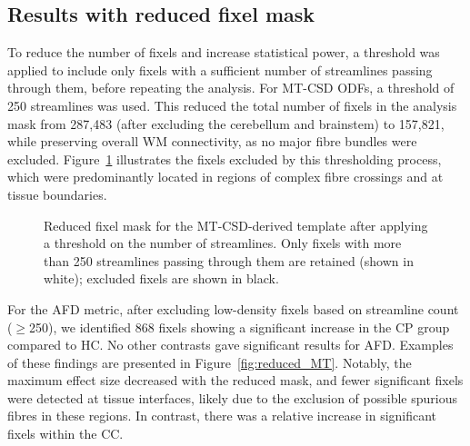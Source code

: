 \subsection{Results with reduced fixel mask}
To reduce the number of fixels and increase statistical power, a threshold was applied to include only fixels with a sufficient number of streamlines passing through them, before repeating the analysis. For MT-CSD ODFs, a threshold of 250 streamlines was used. This reduced the total number of fixels in the analysis mask from 287,483 (after excluding the cerebellum and brainstem) to 157,821, while preserving overall WM connectivity, as no major fibre bundles were excluded. Figure~\ref{fig:reduced} illustrates the fixels excluded by this thresholding process, which were predominantly located in regions of complex fibre crossings and at tissue boundaries.

\begin{figure}[h]
    \centering
    \hfill
    \caption{Reduced fixel mask for the MT-CSD-derived template after applying a threshold on the number of streamlines. Only fixels with more than 250 streamlines passing through them are retained (shown in white); excluded fixels are shown in black.}
    \label{fig:reduced}
\end{figure}


For the AFD metric, after excluding low-density fixels based on streamline count ($\geq$250), we identified 868 fixels showing a significant increase in the CP group compared to HC. No other contrasts gave significant results for AFD. Examples of these findings are presented in Figure~\ref{fig:reduced_MT}. Notably, the maximum effect size decreased with the reduced mask, and fewer significant fixels were detected at tissue interfaces, likely due to the exclusion of possible spurious fibres in these regions. In contrast, there was a relative increase in significant fixels within the CC.

